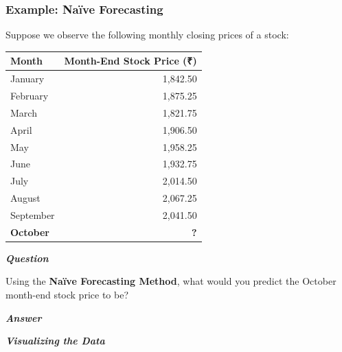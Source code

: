 \documentclass[
  a4paper,
]{article}
\newcounter{none} %
\begin{document}
\subsubsection{Example: Naïve
Forecasting}\label{example-nauxefve-forecasting}

Suppose we observe the following monthly closing prices of a stock:

{\def\LTcaptype{none} %
\begin{longtable}[]{@{}lr@{}}
\toprule\noalign{}
Month & Month-End Stock Price (₹) \\
\midrule\noalign{}
\endhead
\bottomrule\noalign{}
\endlastfoot
January & 1,842.50 \\
February & 1,875.25 \\
March & 1,821.75 \\
April & 1,906.50 \\
May & 1,958.25 \\
June & 1,932.75 \\
July & 2,014.50 \\
August & 2,067.25 \\
September & 2,041.50 \\
\textbf{October} & \textbf{?} \\
\end{longtable}
}

\textbf{\emph{Question}}

Using the \textbf{Naïve Forecasting Method}, what would you predict the
October month-end stock price to be?

\textbf{\emph{Answer}}

\textbf{\emph{Visualizing the Data}}
\end{document}
